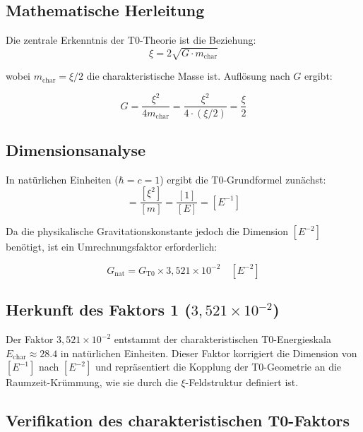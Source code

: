 \documentclass[11pt,a4paper]{article}
\begin{document}
	\subsection{Mathematische Herleitung}
	
	Die zentrale Erkenntnis der T0-Theorie ist die Beziehung:
	\begin{equation}
		\xi = 2\sqrt{G \cdot m_{\text{char}}}
	\end{equation}
	
	wobei $m_{\text{char}} = \xi/2$ die charakteristische Masse ist. Auflösung nach $G$ ergibt:
	
	\begin{equation}
		\boxed{G = \frac{\xi^2}{4m_{\text{char}}} = \frac{\xi^2}{4 \cdot (\xi/2)} = \frac{\xi}{2}}
	\end{equation}
	
	\subsection{Dimensionsanalyse}
	
	In natürlichen Einheiten ($\hbar = c = 1$) ergibt die T0-Grundformel zunächst:
	\begin{equation}
		[G_{\text{T0}}] = \frac{[\xi^2]}{[m]} = \frac{[1]}{[E]} = [E^{-1}]
	\end{equation}
	
	Da die physikalische Gravitationskonstante jedoch die Dimension $[E^{-2}]$ benötigt, ist ein Umrechnungsfaktor erforderlich:
	
	\begin{equation}
		G_{\text{nat}} = G_{\text{T0}} \times 3{,}521 \times 10^{-2} \quad [E^{-2}]
	\end{equation}
	
	\subsection{Herkunft des Faktors 1 ($3{,}521 \times 10^{-2}$)}
	
	Der Faktor $3{,}521 \times 10^{-2}$ entstammt der charakteristischen T0-Energieskala $E_{\text{char}} \approx 28.4$ in natürlichen Einheiten. Dieser Faktor korrigiert die Dimension von $[E^{-1}]$ nach $[E^{-2}]$ und repräsentiert die Kopplung der T0-Geometrie an die Raumzeit-Krümmung, wie sie durch die $\xi$-Feldstruktur definiert ist.
	

	
	
\subsection{Verifikation des charakteristischen T0-Faktors}
\end{document}

